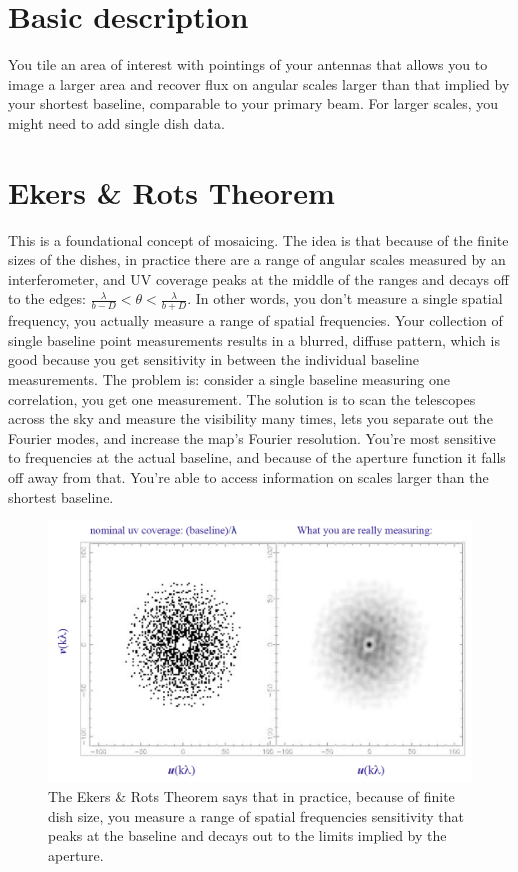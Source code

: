 \documentclass[a4paper]{article}
\begin{document}
\section{Basic description}

You tile an area of interest with pointings of your antennas that allows you to image a larger area and recover flux on angular scales larger than that implied by your shortest baseline, comparable to your primary beam. For larger scales, you might need to add single dish data.

\section{Ekers \& Rots Theorem}

This is a foundational concept of mosaicing. The idea is that because of the finite sizes of the dishes, in practice there are a range of angular scales measured by an interferometer, and UV coverage peaks at the middle of the ranges and decays off to the edges: $ \frac{\lambda}{b-D} < \theta < \frac{\lambda}{b+D} $. In other words, you don't measure a single spatial frequency, you actually measure a range of spatial frequencies. Your collection of single baseline point measurements results in a blurred, diffuse pattern, 
which is good because you get sensitivity in between the individual baseline measurements. The problem is: consider a single baseline measuring one correlation, you get one measurement. The solution is to scan the telescopes across the sky and measure the visibility many times, lets you separate out the Fourier modes, and increase the map's Fourier resolution. You're most sensitive to frequencies at the actual baseline, and because of the aperture function it falls off away from that. You're able to access information on scales larger than the shortest baseline. 

\begin{figure}
\centering
\includegraphics[width=1.0\textwidth]{EkersRots.png} 
\caption{The Ekers \& Rots Theorem says that in practice, because of finite dish size, you measure a range of spatial frequencies sensitivity that peaks at the baseline and decays out to the limits implied by the aperture.}
\label{EkersRots}
\end{figure}
\end{document}

